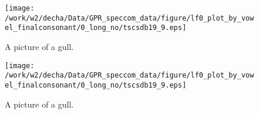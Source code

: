 \documentclass[a4paper,12pt]{article}
\begin{document}
\begin{minipage}{.25\textwidth}
\begin{figure}
  \caption{A picture of a gull.}
  \centering
    \texttt{[image: /work/w2/decha/Data/GPR\_speccom\_data/figure/lf0\_plot\_by\_vowel\_finalconsonant/0\_long\_no/tscsdb19\_9.eps]}
\end{figure}
\end{minipage}

\begin{minipage}{.25\textwidth}
\begin{figure}
  \caption{A picture of a gull.}
  \centering
    \texttt{[image: /work/w2/decha/Data/GPR\_speccom\_data/figure/lf0\_plot\_by\_vowel\_finalconsonant/0\_long\_no/tscsdb19\_9.eps]}
\end{figure}
\end{minipage}
\end{document}
